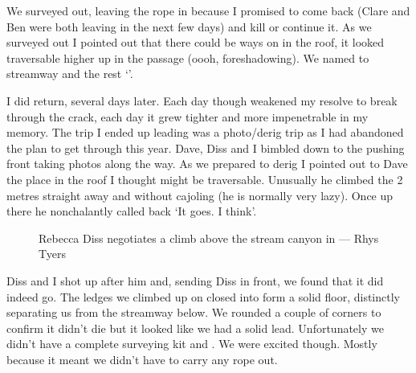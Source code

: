 We surveyed out, leaving the rope in because I promised to come back (Clare and Ben were both leaving in the next few days) and kill or continue it. As we surveyed out I pointed out that there could be ways on in the roof, it looked traversable higher up in the passage (oooh, foreshadowing). We named to streamway  and the rest `'.

 \begin{marginfigure}
\end{marginfigure}  


\label{sec:sweet baby jesus}

I did return, several days later. Each day though weakened my resolve to break through the crack, each day it grew tighter and more impenetrable in my memory. The trip I ended up leading was a photo/derig trip as I had abandoned the plan to get through this year. Dave, Diss and I bimbled down to the pushing front taking photos along the way. As we prepared to derig I pointed out to Dave the place in the roof I thought might be traversable. Unusually he climbed the 2 metres straight away and without cajoling (he is normally very lazy). Once up there he nonchalantly called back `It goes. I think'.
  \begin{figure}[t!]
\checkoddpage \ifoddpage \forcerectofloat \else \forceversofloat \fi
     \centering
        \caption{ Rebecca Diss negotiates a climb above the stream canyon in \protect{} ---  Rhys Tyers} \label{Diss Hallelujah}
\end{figure} 
 
Diss and I shot up after him and, sending Diss in front, we found that it did indeed go. The ledges we climbed up on closed into form a solid floor, distinctly separating us from the streamway below. We rounded a couple of corners to confirm it didn't die but it looked like we had a solid lead. Unfortunately we didn't have a complete surveying kit and . We were excited though. Mostly because it meant we didn't have to carry any rope out.
 
